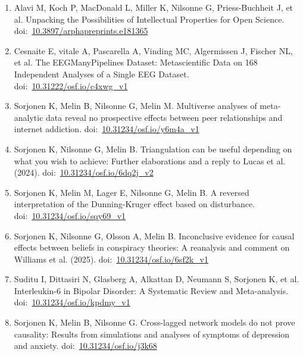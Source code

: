 \documentclass[10pt,a4paper,twocolumn]{article}
\begin{document}
\begin{enumerate}
    \item Alavi M, Koch P, MacDonald L, Miller K, Nilsonne G, Priess-Buchheit J, et al. Unpacking the Possibilities of Intellectual Properties for Open Science. doi:~\href{https://doi.org/10.3897/arphapreprints.e181365}{10.3897/arphapreprints.e181365}

    \item Cesnaite E, vitale A, Pascarella A, Vinding MC, Algermissen J, Fischer NL, et al. The EEGManyPipelines Dataset: Metascientific Data on 168 Independent Analyses of a Single EEG Dataset. doi:~\href{https://doi.org/10.31222/osf.io/c4xwg_v1}{10.31222/osf.io/c4xwg\_v1}

    \item Sorjonen K, Melin B, Nilsonne G, Melin M. Multiverse analyses of meta-analytic data reveal no prospective effects between peer relationships and internet addiction. doi:~\href{https://doi.org/10.31234/osf.io/y6m4a_v1}{10.31234/osf.io/y6m4a\_v1}

    \item Sorjonen K, Nilsonne G, Melin B. Triangulation can be useful depending on what you wish to achieve: Further elaborations and a reply to Lucas et al. (2024). doi:~\href{https://doi.org/10.31234/osf.io/6dq2j_v2}{10.31234/osf.io/6dq2j\_v2}

    \item Sorjonen K, Melin M, Lager E, Nilsonne G, Melin B. A reversed interpretation of the Dunning-Kruger effect based on disturbance. doi:~\href{https://doi.org/10.31234/osf.io/sqy69_v1}{10.31234/osf.io/sqy69\_v1}

    \item Sorjonen K, Nilsonne G, Olsson A, Melin B. Inconclusive evidence for causal effects between beliefs in conspiracy theories: A reanalysis and comment on Williams et al. (2025). doi:~\href{https://doi.org/10.31234/osf.io/6sf2k_v1}{10.31234/osf.io/6sf2k\_v1}

    \item Suditu I, Dittasiri N, Glasberg A, Alkattan D, Neumann S, Sorjonen K, et al. Interleukin-6 in Bipolar Disorder: A Systematic Review and Meta-analysis. doi:~\href{https://doi.org/10.31234/osf.io/kpdmy_v1}{10.31234/osf.io/kpdmy\_v1}

    \item Sorjonen K, Melin B, Nilsonne G. Cross-lagged network models do not prove causality: Results from simulations and analyses of symptoms of depression and anxiety. doi:~\href{https://doi.org/10.31234/osf.io/j3k68}{10.31234/osf.io/j3k68}


\end{enumerate}
\end{document}
